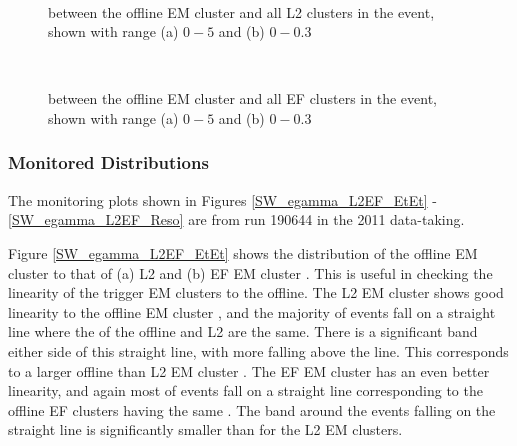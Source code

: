 \begin{figure}
\centering
\mbox{
   \quad
      \quad
}
\caption[\dr{} between offline and L2 EM object]{\dr{} between the offline EM cluster and all L2 clusters in the event, shown with range (a) $0 - 5$ and (b) $0 - 0.3$ \label{SW_egamma_L2_dR}}
\end{figure}

\begin{figure}
\centering
\mbox{
   \quad
      \quad
}
\caption[\dr{} between offline and EF EM object]{\dr{} between the offline EM cluster and all EF clusters in the event, shown with range (a) $0 - 5$ and (b) $0 - 0.3$\label{SW_egamma_EF_dR}}
\end{figure}




\subsubsection{Monitored Distributions}


The monitoring plots shown in Figures \ref{SW_egamma_L2EF_EtEt} -\ref{SW_egamma_L2EF_Reso} are from run 190644 in the  2011 data-taking.


Figure \ref{SW_egamma_L2EF_EtEt} shows the distribution of the offline EM cluster \et{} to that of (a) L2 and (b) EF EM cluster \et{}.
This is useful in checking the linearity of the trigger EM clusters to the offline. 
The L2 EM cluster \et{} shows good linearity to the offline EM cluster \et{}, and the majority of events fall on a straight line where the \et{} of the offline and L2 are the same.
There is a significant band either side of this straight line, with more falling above the line.
This corresponds to a larger offline \et{} than L2 EM cluster \et{}.
The EF EM cluster \et{} has an even better linearity, and again most of events fall on a straight line corresponding to the offline EF clusters having the same \et{}.
The band around the events falling on the straight line is significantly smaller than for the L2 EM clusters.


